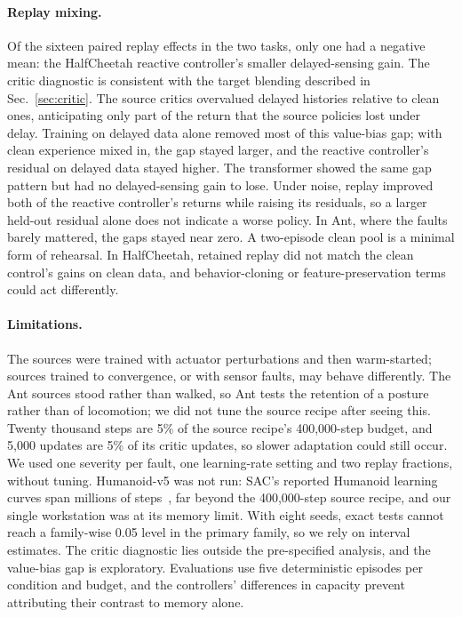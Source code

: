 \paragraph{Replay mixing.} Of the sixteen paired replay effects in the two tasks, only one had a negative mean: the HalfCheetah reactive controller's smaller delayed-sensing gain. The critic diagnostic is consistent with the target blending described in Sec.~\ref{sec:critic}. The source critics overvalued delayed histories relative to clean ones, anticipating only part of the return that the source policies lost under delay. Training on delayed data alone removed most of this value-bias gap; with clean experience mixed in, the gap stayed larger, and the reactive controller's residual on delayed data stayed higher. The transformer showed the same gap pattern but had no delayed-sensing gain to lose. Under noise, replay improved both of the reactive controller's returns while raising its residuals, so a larger held-out residual alone does not indicate a worse policy. In Ant, where the faults barely mattered, the gaps stayed near zero. A two-episode clean pool is a minimal form of rehearsal. In HalfCheetah, retained replay did not match the clean control's gains on clean data, and behavior-cloning or feature-preservation terms~\cite{clear,finetuneforget} could act differently.

\paragraph{Limitations.} The sources were trained with actuator perturbations and then warm-started; sources trained to convergence, or with sensor faults, may behave differently. The Ant sources stood rather than walked, so Ant tests the retention of a posture rather than of locomotion; we did not tune the source recipe after seeing this. Twenty thousand steps are 5\% of the source recipe's 400,000-step budget, and 5,000 updates are 5\% of its critic updates, so slower adaptation could still occur. We used one severity per fault, one learning-rate setting and two replay fractions, without tuning. Humanoid-v5 was not run: SAC's reported Humanoid learning curves span millions of steps~\cite{sac}, far beyond the 400,000-step source recipe, and our single workstation was at its memory limit. With eight seeds, exact tests cannot reach a family-wise 0.05 level in the primary family, so we rely on interval estimates. The critic diagnostic lies outside the pre-specified analysis, and the value-bias gap is exploratory. Evaluations use five deterministic episodes per condition and budget, and the controllers' differences in capacity prevent attributing their contrast to memory alone.
